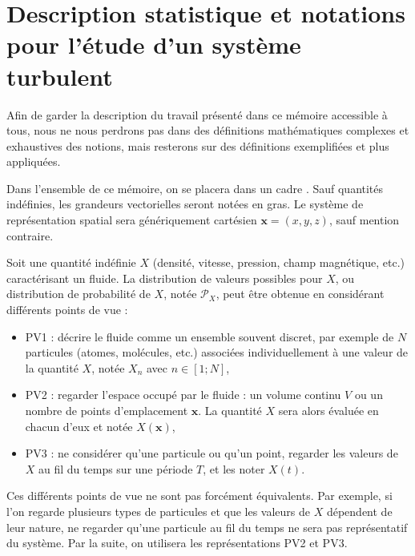\section{Description statistique et notations pour l'étude d'un système turbulent}\label{sec-012}

Afin de garder la description du travail présenté dans ce mémoire accessible à tous, nous ne nous perdrons pas dans des définitions mathématiques complexes et exhaustives des notions, mais resterons sur des définitions exemplifiées et plus appliquées. 

Dans l'ensemble de ce mémoire, on se placera dans un cadre . Sauf quantités indéfinies, les grandeurs vectorielles seront notées en gras. Le système de représentation spatial sera génériquement cartésien $\mathbf{x} = (x,y,z)$, sauf mention contraire.

Soit une quantité indéfinie $X$ (densité, vitesse, pression, champ magnétique, etc.) caractérisant un fluide. La distribution de valeurs possibles pour $X$, ou distribution de probabilité de $X$, notée $\mathcal{P}_X$, peut être obtenue en considérant différents points de vue :
\begin{itemize}
    \item PV1 : décrire le fluide comme un ensemble souvent discret, par exemple de $N$ particules (atomes, molécules, etc.) associées individuellement à une valeur de la quantité $X$, notée $X_n$ avec $n \in [1;N]$,
    \item PV2 : regarder l'espace occupé par le fluide : un volume continu $V$ ou un nombre de points d'emplacement $\mathbf{x}$. La quantité $X$ sera alors évaluée en chacun d'eux et notée $X(\mathbf{x})$, 
    \item PV3 : ne considérer qu'une particule ou qu'un point, regarder les valeurs de $X$ au fil du temps sur une période $T$, et les noter $X(t)$. 
\end{itemize}
Ces différents points de vue ne sont pas forcément équivalents. Par exemple, si l'on regarde plusieurs types de particules et que les valeurs de $X$ dépendent de leur nature, ne regarder qu'une particule au fil du temps ne sera pas représentatif du système. Par la suite, on utilisera les représentations PV2 et PV3.  

